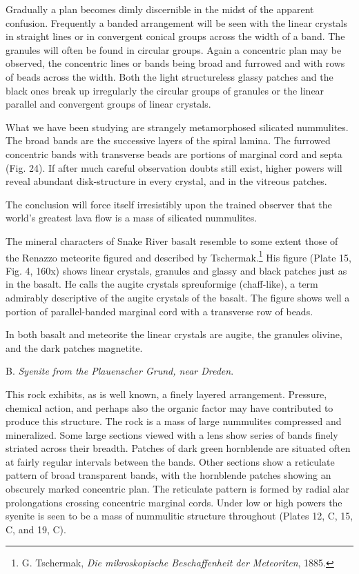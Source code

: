 \documentclass[a4paper, 12pt, oneside]{article}
\begin{document}
Gradually a plan becomes dimly discernible in the midst of the apparent confusion. Frequently a banded arrangement will be seen with the linear crystals in straight lines or in convergent conical groups across the width of a band. The granules will often be found in circular groups. Again a concentric plan may be observed, the concentric lines or bands being broad and furrowed and with rows of beads across the width. Both the light structureless glassy patches and the black ones break up irregularly the circular groups of granules or the linear parallel and convergent groups of linear crystals.

What we have been studying are strangely metamorphosed silicated nummulites. The broad bands are the successive layers of the spiral lamina. The furrowed concentric bands with transverse beads are portions of marginal cord and septa (Fig. 24). If after much careful observation doubts still exist, higher powers will reveal abundant disk-structure in every crystal, and in the vitreous patches.

The conclusion will force itself irresistibly upon the trained observer that the world's greatest lava flow is a mass of silicated nummulites.

The mineral characters of Snake River basalt resemble to some extent those of the Renazzo meteorite figured and described by Tschermak.\footnote{G. Tschermak, \emph{Die mikroskopische Beschaffenheit der Meteoriten}, 1885.} His figure (Plate 15, Fig. 4, 160x) shows linear crystals, granules and glassy and black patches just as in the basalt. He calls the augite crystals spreuformige (chaff-like), a term admirably descriptive of the augite crystals of the basalt. The figure shows well a portion of parallel-banded marginal cord with a transverse row of beads.

In both basalt and meteorite the linear crystals are augite, the granules olivine, and the dark patches magnetite.

B. \emph{Syenite from the Plauenscher Grund, near Dreden}.

This rock exhibits, as is well known, a finely layered arrangement. Pressure, chemical action, and perhaps also the organic factor may have contributed to produce this structure. The rock is a mass of large nummulites compressed and mineralized. Some large sections viewed with a lens show series of bands finely striated across their breadth. Patches of dark green hornblende are situated often at fairly regular intervals between the bands. Other sections show a reticulate pattern of broad transparent bands, with the hornblende patches showing an obscurely marked concentric plan. The reticulate pattern is formed by radial alar prolongations crossing concentric marginal cords. Under low or high powers the syenite is seen to be a mass of nummulitic structure throughout (Plates 12, C, 15, C, and 19, C).
\end{document}
